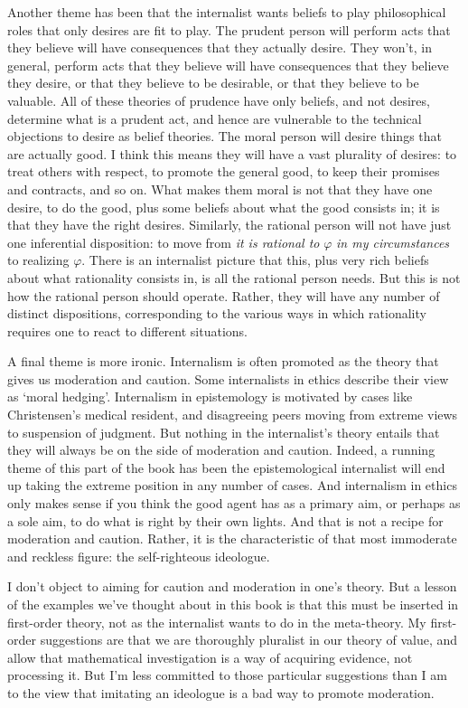 Another theme has been that the internalist wants beliefs to play philosophical roles that only desires are fit to play. The prudent person will perform acts that they believe will have consequences that they actually desire. They won't, in general, perform acts that they believe will have consequences that they believe they desire, or that they believe to be desirable, or that they believe to be valuable. All of these theories of prudence have only beliefs, and not desires, determine what is a prudent act, and hence are vulnerable to the technical objections to desire as belief theories. The moral person will desire things that are actually good. I think this means they will have a vast plurality of desires: to treat others with respect, to promote the general good, to keep their promises and contracts, and so on. What makes them moral is not that they have one desire, to do the good, plus some beliefs about what the good consists in; it is that they have the right desires. Similarly, the rational person will not have just one inferential disposition: to move from \emph{it is rational to} $\varphi$ \emph{in my circumstances} to realizing $\varphi$. There is an internalist picture that this, plus very rich beliefs about what rationality consists in, is all the rational person needs. But this is not how the rational person should operate. Rather, they will have any number of distinct dispositions, corresponding to the various ways in which rationality requires one to react to different situations.

A final theme is more ironic. Internalism is often promoted as the theory that gives us moderation and caution. Some internalists in ethics describe their view as ‘moral hedging'. Internalism in epistemology is motivated by cases like Christensen's medical resident, and disagreeing peers moving from extreme views to suspension of judgment. But nothing in the internalist's theory entails that they will always be on the side of moderation and caution. Indeed, a running theme of this part of the book has been the epistemological internalist will end up taking the extreme position in any number of cases. And internalism in ethics only makes sense if you think the good agent has as a primary aim, or perhaps as a sole aim, to do what is right by their own lights. And that is not a recipe for moderation and caution. Rather, it is the characteristic of that most immoderate and reckless figure: the self-righteous ideologue.

I don't object to aiming for caution and moderation in one's theory. But a lesson of the examples we've thought about in this book is that this must be inserted in first-order theory, not as the internalist wants to do in the meta-theory. My first-order suggestions are that we are thoroughly pluralist in our theory of value, and allow that mathematical investigation is a way of acquiring evidence, not processing it. But I'm less committed to those particular suggestions than I am to the view that imitating an ideologue is a bad way to promote moderation.

